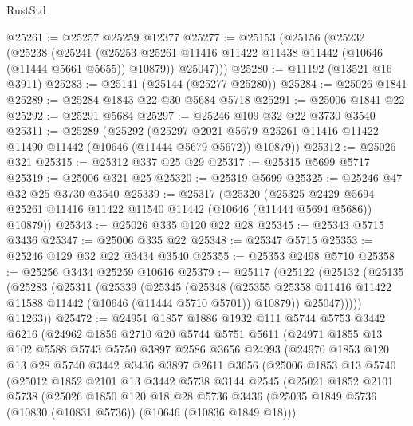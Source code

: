 \begin{lexlean}{RustStd}
\begin{coremodule}
@25261 := @25257 @25259 @12377
@25277 := @25153
    (@25156
      (@25232
        (@25238
          (@25241 (@25253 @25261 @11416 @11422 @11438 @11442 (@10646 (@11444 @5661 @5655)) @10879))
          @25047)))
@25280 := @11192 (@13521 @16 @3911)
@25283 := @25141 (@25144 (@25277 @25280))
@25284 := @25026 @1841
@25289 := @25284 @1843 @22 @30 @5684 @5718
@25291 := @25006 @1841 @22
@25292 := @25291 @5684
@25297 := @25246 @109 @32 @22 @3730 @3540
@25311 := @25289
    (@25292
      (@25297 @2021 @5679 @25261 @11416 @11422 @11490 @11442 (@10646 (@11444 @5679 @5672)) @10879))
@25312 := @25026 @321
@25315 := @25312 @337 @25 @29
@25317 := @25315 @5699 @5717
@25319 := @25006 @321 @25
@25320 := @25319 @5699
@25325 := @25246 @47 @32 @25 @3730 @3540
@25339 := @25317
    (@25320
      (@25325 @2429 @5694 @25261 @11416 @11422 @11540 @11442 (@10646 (@11444 @5694 @5686)) @10879))
@25343 := @25026 @335 @120 @22 @28
@25345 := @25343 @5715 @3436
@25347 := @25006 @335 @22
@25348 := @25347 @5715
@25353 := @25246 @129 @32 @22 @3434 @3540
@25355 := @25353 @2498 @5710
@25358 := @25256 @3434 @25259 @10616
@25379 := @25117
    (@25122
      (@25132
        (@25135
          (@25283
            (@25311
              (@25339
                (@25345
                  (@25348
                    (@25355
                      @25358
                      @11416
                      @11422
                      @11588
                      @11442
                      (@10646 (@11444 @5710 @5701))
                      @10879))
                  @25047)))))
        @11263))
@25472 := @24951
    @1857
    @1886
    @1932
    @111
    @5744
    @5753
    @3442
    @6216
    (@24962
      @1856
      @2710
      @20
      @5744
      @5751
      @5611
      (@24971
        @1855
        @13
        @102
        @5588
        @5743
        @5750
        @3897
        @2586
        @3656
        @24993
        (@24970
          @1853
          @120
          @13
          @28
          @5740
          @3442
          @3436
          @3897
          @2611
          @3656
          (@25006
            @1853
            @13
            @5740
            (@25012
              @1852
              @2101
              @13
              @3442
              @5738
              @3144
              @2545
              (@25021
                @1852
                @2101
                @5738
                (@25026
                  @1850
                  @120
                  @18
                  @28
                  @5736
                  @3436
                  (@25035 @1849 @5736 (@10830 (@10831 @5736)) (@10646 (@10836 @1849 @18)))

\end{coremodule}
\end{lexlean}
